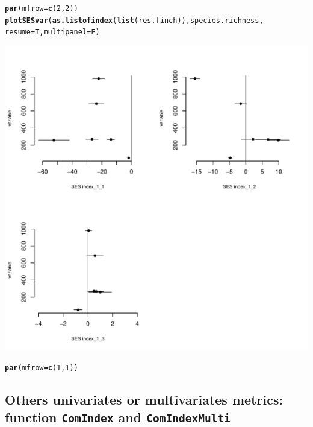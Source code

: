 \documentclass[12pt]{article}\usepackage[]{graphicx}\usepackage[]{color}
\makeatletter
\def\maxwidth{ %
  \ifdim\Gin@nat@width>\linewidth
    \linewidth
  \else
    \Gin@nat@width
  \fi
}
\newcommand{\hlnum}[1]{\textcolor[rgb]{0.686,0.059,0.569}{#1}}%
\newcommand{\hlstd}[1]{\textcolor[rgb]{0.345,0.345,0.345}{#1}}%
\newcommand{\hlkwc}[1]{\textcolor[rgb]{0.333,0.667,0.333}{#1}}%
\newcommand{\hlkwd}[1]{\textcolor[rgb]{0.737,0.353,0.396}{\textbf{#1}}}%
\newenvironment{kframe}{%
 \def\at@end@of@kframe{}%
 \ifinner\ifhmode%
  \def\at@end@of@kframe{\end{minipage}}%
  \begin{minipage}{\columnwidth}%
 \fi\fi%
 \def\FrameCommand##1{\hskip\@totalleftmargin \hskip-\fboxsep
 \colorbox{shadecolor}{##1}\hskip-\fboxsep
     \hskip-\linewidth \hskip-\@totalleftmargin \hskip\columnwidth}%
 \MakeFramed {\advance\hsize-\width
   \@totalleftmargin\z@ \linewidth\hsize
   \@setminipage}}%
 {\par\unskip\endMakeFramed%
 \at@end@of@kframe}
\newenvironment{knitrout}{}{} %
\makeatother
\begin{document}
\begin{knitrout}
\color{fgcolor}\begin{kframe}
\begin{alltt}
\hlkwd{par}\hlstd{(}\hlkwc{mfrow} \hlstd{=} \hlkwd{c}\hlstd{(}\hlnum{2}\hlstd{,}\hlnum{2}\hlstd{))}
\hlkwd{plotSESvar}\hlstd{(}\hlkwd{as.listofindex}\hlstd{(}\hlkwd{list}\hlstd{(res.finch)), species.richness,}
       \hlkwc{resume} \hlstd{= T,} \hlkwc{multipanel} \hlstd{= F)}
\end{alltt}
\end{kframe}
\includegraphics[width=\maxwidth]{figure/unnamed-chunk-42-1} 
\begin{kframe}\begin{alltt}
\hlkwd{par}\hlstd{(}\hlkwc{mfrow} \hlstd{=} \hlkwd{c}\hlstd{(}\hlnum{1}\hlstd{,}\hlnum{1}\hlstd{))}
\end{alltt}
\end{kframe}
\end{knitrout}


\newpage
\subsection{Others univariates or multivariates metrics: function \texttt{ComIndex} and \texttt{ComIndexMulti}}
\end{document}
